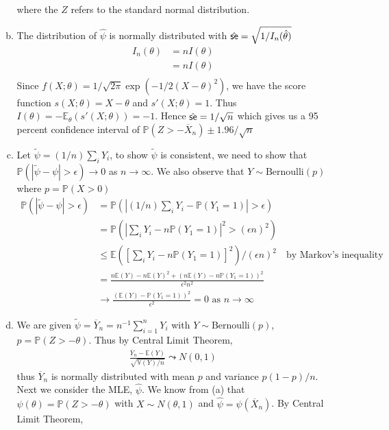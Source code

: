 \documentclass[a4paper,10pt]{article}
\theoremstyle{definition}
\begin{document}
\begin{enumerate}
\begin{enumerate}[(a)]
where the $Z$ refers to the standard normal distribution.
\item The distribution of $\hat{\psi}$ is normally distributed with $\hat{\text{\sffamily se}} = \sqrt{1/I_n(\hat{\theta})}$
\begin{align*}
I_n(\theta) &= nI(\theta)\\
&= nI(\theta)\\
\end{align*}
Since $f(X;\theta) = 1/\sqrt{2\pi}\exp(-1/2(X-\theta)^2)$, we have the score function $s(X;\theta) = X - \theta$ and $s'(X;\theta) = 1$. Thus $I(\theta) = -\mathbb{E}_\theta(s'(X;\theta))=-1$. Hence $\hat{\text{\sffamily se}} = 1/\sqrt{n}$ which gives us a 95 percent confidence interval of $\mathbb{P}\left( Z> -\overline{X}_n\right) \pm 1.96/\sqrt{n}$
\item Let $\tilde{\psi} = (1/n)\sum_iY_i$, to show $\tilde{\psi}$ is consistent, we need to show that $\mathbb{P}(|\tilde{\psi} - \psi|>\epsilon) \to 0$ as $n \to \infty$. We also observe that $Y\sim \text{Bernoulli}(p)$ where $p = \mathbb{P}(X>0)$
\begin{align*}
\mathbb{P}(|\tilde{\psi} - \psi|>\epsilon) &= \mathbb{P}(|(1/n)\sum_iY_i - \mathbb{P}(Y_1=1)|>\epsilon)\\
&=\mathbb{P}\left(\left|\sum_iY_i - n\mathbb{P}(Y_1=1)\right|^2>(\epsilon n)^2\right)\\
&\leq \mathbb{E}\left(\left[\sum_iY_i - n\mathbb{P}(Y_1=1)\right]^2\right)/(\epsilon n)^2\quad \text{by Markov's inequality}\\
&=\frac{n\mathbb{E}(Y)-n\mathbb{E}(Y)^2+\left(n\mathbb{E}(Y)-n\mathbb{P}(Y_1=1)\right)^2}{\epsilon^2n^2}\\
&\to \frac{(\mathbb{E}(Y)-\mathbb{P}(Y_1=1))^2}{\epsilon^2}=0 \text{ as } n \to \infty
\end{align*}
\item We are given $\tilde{\psi} = \overline{Y}_n = n^{-1}\sum_{i=1}^{n}Y_i$ with $Y \sim \text{Bernoulli}(p)$, $p = \mathbb{P}(Z>-\theta)$. Thus by Central Limit Theorem,
\begin{align*}
\frac{\overline{Y}_n-\mathbb{E}(Y)}{\sqrt{\mathbb{V}(Y)/n}} \leadsto N(0,1)
\end{align*}
thus $\overline{Y}_n$ is normally distributed with mean $p$ and variance $p(1-p)/n$. Next we consider the {\sffamily MLE}, $\hat{\psi}$. We know from (a) that $\psi(\theta) = \mathbb{P}(Z > -\theta)$ with $X \sim N(\theta, 1)$ and $\hat{\psi} = \psi(\overline{X}_n)$. By Central Limit Theorem,
\begin{align*}

\end{align*}
\end{enumerate}
\end{enumerate}
\end{document}

